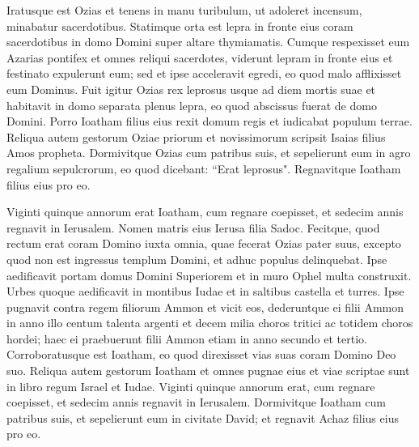 \begin{biblechapter}
\verse Iratusque est Ozias et tenens in manu turibulum, ut adoleret incensum, minabatur sacerdotibus. Statimque orta est lepra in fronte eius coram sacerdotibus in domo Domini super altare thymiamatis. 
\verse Cumque respexisset eum Azarias pontifex et omnes reliqui sacerdotes, viderunt lepram in fronte eius et festinato expulerunt eum; sed et ipse acceleravit egredi, eo quod malo afflixisset eum Dominus. 
\verse Fuit igitur Ozias rex leprosus usque ad diem mortis suae et habitavit in domo separata plenus lepra, eo quod abscissus fuerat de domo Domini. Porro Ioatham filius eius rexit domum regis et iudicabat populum terrae. 
\verse Reliqua autem gestorum Oziae priorum et novissimorum scripsit Isaias filius Amos propheta. 
\verse Dormivitque Ozias cum patribus suis, et sepelierunt eum in agro regalium sepulcrorum, eo quod dicebant: “Erat leprosus". Regnavitque Ioatham filius eius pro eo. 
\end{biblechapter}

\begin{biblechapter}  
\verse Viginti quinque annorum erat Ioatham, cum regnare coepisset, et sedecim annis regnavit in Ierusalem. Nomen matris eius Ierusa filia Sadoc. 
\verse Fecitque, quod rectum erat coram Domino iuxta omnia, quae fecerat Ozias pater suus, excepto quod non est ingressus templum Domini, et adhuc populus delinquebat. 
\verse Ipse aedificavit portam domus Domini Superiorem et in muro Ophel multa construxit. 
\verse Urbes quoque aedificavit in montibus Iudae et in saltibus castella et turres. 
\verse Ipse pugnavit contra regem filiorum Ammon et vicit eos, dederuntque ei filii Ammon in anno illo centum talenta argenti et decem milia choros tritici ac totidem choros hordei; haec ei praebuerunt filii Ammon etiam in anno secundo et tertio. 
\verse Corroboratusque est Ioatham, eo quod direxisset vias suas coram Domino Deo suo. 
\verse Reliqua autem gestorum Ioatham et omnes pugnae eius et viae scriptae sunt in libro regum Israel et Iudae. 
\verse Viginti quinque annorum erat, cum regnare coepisset, et sedecim annis regnavit in Ierusalem. 
\verse Dormivitque Ioatham cum patribus suis, et sepelierunt eum in civitate David; et regnavit Achaz filius eius pro eo. 
\end{biblechapter}

